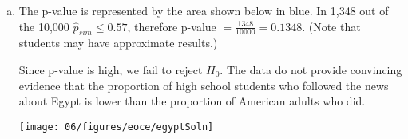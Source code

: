 {{\begin{enumerate}[(a)]
\item The p-value is represented by the area shown below in blue. In 1,348 out of the 10,000 $\hat{p}_{sim} \le 0.57$, therefore p-value $= \frac{1348}{10000} = 0.1348$. (Note that students may have approximate results.) 
\noindent \begin{minipage}[c]{0.5\textwidth}
Since p-value is high, we fail to reject $H_0$. The data do not provide convincing evidence that the proportion of high school students who followed the news about Egypt is lower than the proportion of American adults who did. 
\end{minipage}
\begin{minipage}[c]{0.5\textwidth}
\begin{center}
\texttt{[image: 06/figures/eoce/egyptSoln]}
\end{center}
\end{minipage}
\end{enumerate}
}
}

%

